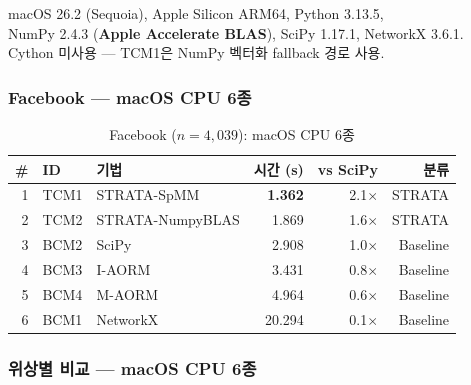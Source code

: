 \documentclass[11pt,a4paper]{article}
\begin{document}
\begin{keypoint}
macOS 26.2 (Sequoia), Apple Silicon ARM64, Python 3.13.5, \\
NumPy 2.4.3 (\textbf{Apple Accelerate BLAS}), SciPy 1.17.1, NetworkX 3.6.1. \\
Cython 미사용 --- TCM1은 NumPy 벡터화 fallback 경로 사용.
\end{keypoint}

\subsubsection{Facebook --- macOS CPU 6종}

\begin{table}[H]\centering
\caption{Facebook ($n\!=\!4{,}039$): macOS CPU 6종}
\label{tab:fb-mac}
\small
\begin{tabular}{@{}rllrrr@{}}
\toprule
\textbf{\#} & \textbf{ID} & \textbf{기법} & \textbf{시간 (s)} & \textbf{vs SciPy} & \textbf{분류} \\
\midrule
\rowcolor{cpubest!8} 1 & TCM1 & STRATA-SpMM & \textbf{1.362} & 2.1$\times$ & STRATA \\
2 & TCM2 & STRATA-NumpyBLAS & 1.869 & 1.6$\times$ & STRATA \\
3 & BCM2 & SciPy & 2.908 & 1.0$\times$ & Baseline \\
4 & BCM3 & I-AORM & 3.431 & 0.8$\times$ & Baseline \\
5 & BCM4 & M-AORM & 4.964 & 0.6$\times$ & Baseline \\
6 & BCM1 & NetworkX & 20.294 & 0.1$\times$ & Baseline \\
\bottomrule
\end{tabular}
\end{table}

\subsubsection{위상별 비교 --- macOS CPU 6종}
\end{document}
